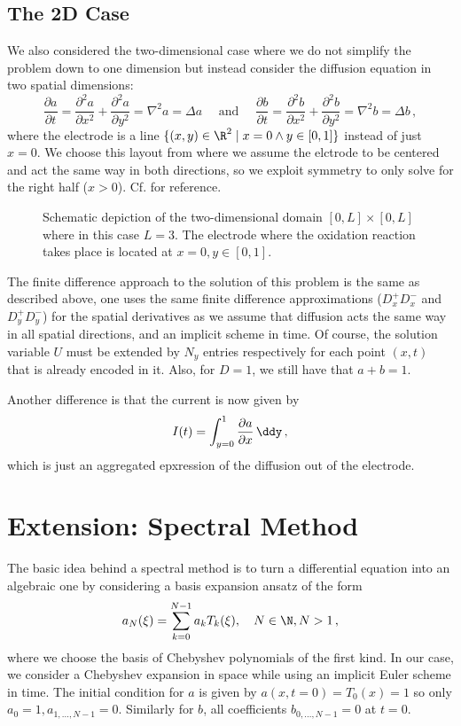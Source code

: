 \documentclass{prettytex/ox/mmsc-special-topic}
\begin{document}
  \subsection{The 2D Case}
  We also considered the two-dimensional case where we do not simplify the problem down to one dimension but instead consider the diffusion equation in two spatial dimensions:
  $$\frac{\partial a}{\partial t} = \frac{\partial^2 a}{\partial x^2} + \frac{\partial^2 a}{\partial y^2} = \nabla^2 a = \Delta a \quad\text{ and }\quad \frac{\partial b}{\partial t} = \frac{\partial^2 b}{\partial x^2} + \frac{\partial^2 b}{\partial y^2} = \nabla^2 b = \Delta b\,,$$
  where the electrode is a line $\{(x, y) \in \R^2 \;|\; x = 0 \wedge y \in [0, 1]\}$ instead of just $x = 0$.
  We choose this layout from  where we assume the elctrode to be centered and act the same way in both directions, so we exploit symmetry to only solve for the right half ($x > 0$).
  Cf.  for reference.

  \begin{figure}[H]
    \centering
    \caption{Schematic depiction of the two-dimensional domain $[0, L] \times [0, L]$ where in this case $L = 3$. The electrode where the oxidation reaction takes place is located at $x=0, y \in [0, 1]$.}
    \label{fig:2d-case}
  \end{figure}

  The finite difference approach to the solution of this problem is the same as described above, one uses the same finite difference approximations ($D_x^+ D_x^-$ and $D_y^+ D_y^-$) for the spatial derivatives as we assume that diffusion acts the same way in all spatial directions, and an implicit scheme in time. Of course, the solution variable $U$ must be extended by $N_y$ entries respectively for each point $(x, t)$ that is already encoded in it.
  Also, for $D = 1$, we still have that $a + b = 1$.

  Another difference is that the current is now given by
  $$I(t) = \int_{y=0}^{1} \frac{\partial a}{\partial x} \,\ddy\,,$$
  which is just an aggregated epxression of the diffusion out of the electrode.


  \section{Extension: Spectral Method}
  \label{sec:spectral-method}
  The basic idea behind a spectral method is to turn a differential equation into an algebraic one by considering a basis expansion ansatz of the form
  \begin{equation}
    a_N(\xi) = \sum_{k=0}^{N-1} a_k T_k(\xi),\quad N \in \N, N > 1\,,
    \label{eq:truncated-cheb-series}
  \end{equation}
  where we choose the basis of Chebyshev polynomials of the first kind.
  In our case, we consider a Chebyshev expansion in space while using an implicit Euler scheme in time.
  The initial condition for $a$ is given by $a(x, t=0) = T_0(x) = 1$ so only $a_0 = 1, a_{1, ..., N-1} = 0$. Similarly for $b$, all coefficients $b_{0, ..., N-1} = 0$ at $t = 0$.
\end{document}
